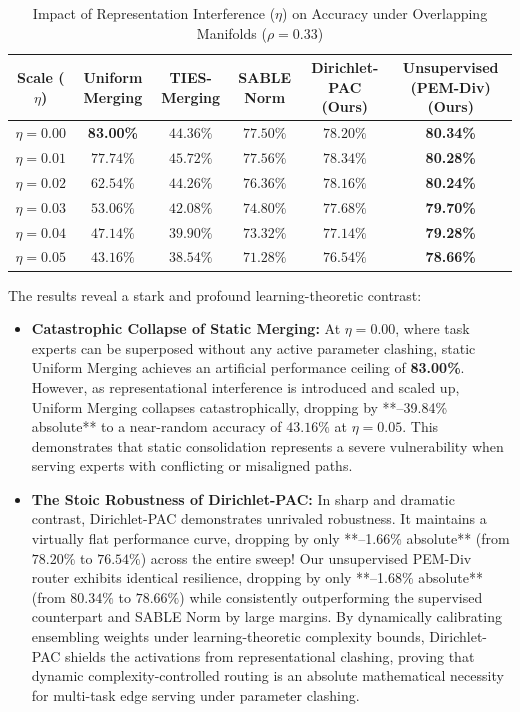 \begin{table}[h]
\centering
\caption{Impact of Representation Interference ($\eta$) on Accuracy under Overlapping Manifolds ($\rho=0.33$)}
\label{tab:ablation_eta}
\vskip 0.15in
\begin{tabular}{cccccc}
\toprule
\textbf{Scale ($\eta$)} & \textbf{Uniform Merging} & \textbf{TIES-Merging} & \textbf{SABLE Norm} & \textbf{Dirichlet-PAC (Ours)} & \textbf{Unsupervised (PEM-Div) (Ours)} \\
\midrule
$\eta = 0.00$ & \textbf{83.00\%} & $44.36\%$ & $77.50\%$ & $78.20\%$ & \textbf{80.34\%} \\
$\eta = 0.01$ & $77.74\%$ & $45.72\%$ & $77.56\%$ & $78.34\%$ & \textbf{80.28\%} \\
$\eta = 0.02$ & $62.54\%$ & $44.26\%$ & $76.36\%$ & $78.16\%$ & \textbf{80.24\%} \\
$\eta = 0.03$ & $53.06\%$ & $42.08\%$ & $74.80\%$ & $77.68\%$ & \textbf{79.70\%} \\
$\eta = 0.04$ & $47.14\%$ & $39.90\%$ & $73.32\%$ & $77.14\%$ & \textbf{79.28\%} \\
$\eta = 0.05$ & $43.16\%$ & $38.54\%$ & $71.28\%$ & $76.54\%$ & \textbf{78.66\%} \\
\bottomrule
\end{tabular}
\end{table}

The results reveal a stark and profound learning-theoretic contrast:
\begin{itemize}
    \item \textbf{Catastrophic Collapse of Static Merging:} At $\eta = 0.00$, where task experts can be superposed without any active parameter clashing, static Uniform Merging achieves an artificial performance ceiling of \textbf{83.00\%}. However, as representational interference is introduced and scaled up, Uniform Merging collapses catastrophically, dropping by **--39.84\% absolute** to a near-random accuracy of $43.16\%$ at $\eta = 0.05$. This demonstrates that static consolidation represents a severe vulnerability when serving experts with conflicting or misaligned paths.
    \item \textbf{The Stoic Robustness of Dirichlet-PAC:} In sharp and dramatic contrast, Dirichlet-PAC demonstrates unrivaled robustness. It maintains a virtually flat performance curve, dropping by only **--1.66\% absolute** (from $78.20\%$ to $76.54\%$) across the entire sweep! Our unsupervised PEM-Div router exhibits identical resilience, dropping by only **--1.68\% absolute** (from $80.34\%$ to $78.66\%$) while consistently outperforming the supervised counterpart and SABLE Norm by large margins. By dynamically calibrating ensembling weights under learning-theoretic complexity bounds, Dirichlet-PAC shields the activations from representational clashing, proving that dynamic complexity-controlled routing is an absolute mathematical necessity for multi-task edge serving under parameter clashing.
\end{itemize}

